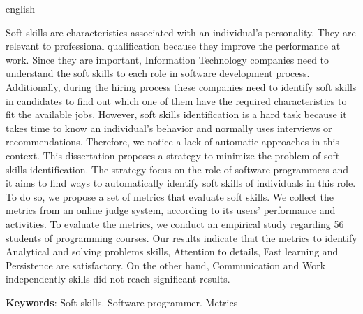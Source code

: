 \documentclass{ppgi}
\begin{document}
\begin{resumo}[Abstract]
\begin{otherlanguage*}{english}

Soft skills are characteristics associated with an individual's personality.
They are relevant to professional qualification because they improve the performance at work.
Since they are important, Information Technology companies need to understand the soft skills to each role in software development process.
Additionally, during the hiring process these companies need to identify soft skills in candidates to find out which one of them have the required characteristics to fit the available jobs.
However, soft skills identification is a hard task because it takes time to know an individual's behavior and normally uses interviews or recommendations.
Therefore, we notice a lack of automatic approaches in this context.
This dissertation proposes a strategy to minimize the problem of soft skills identification.
The strategy focus on the role of software programmers and it aims to find ways to automatically identify soft skills of individuals in this role.
To do so, we propose a set of metrics that evaluate soft skills.
We collect the metrics from an online judge system, according to its users' performance and activities.
To evaluate the metrics, we conduct an empirical study regarding 56 students of programming courses.
Our results indicate that the metrics to identify Analytical and solving problems skills, Attention to details, Fast learning and Persistence are satisfactory.
On the other hand, Communication and Work independently skills did not reach significant results.

\posresumo

\textbf{Keywords}: Soft skills. Software programmer. Metrics
\end{otherlanguage*}
\end{resumo}

\listailustracoes

\listatabelas

\sumario

\elementostextuais




%







\postextual



\apendices


\end{document}
